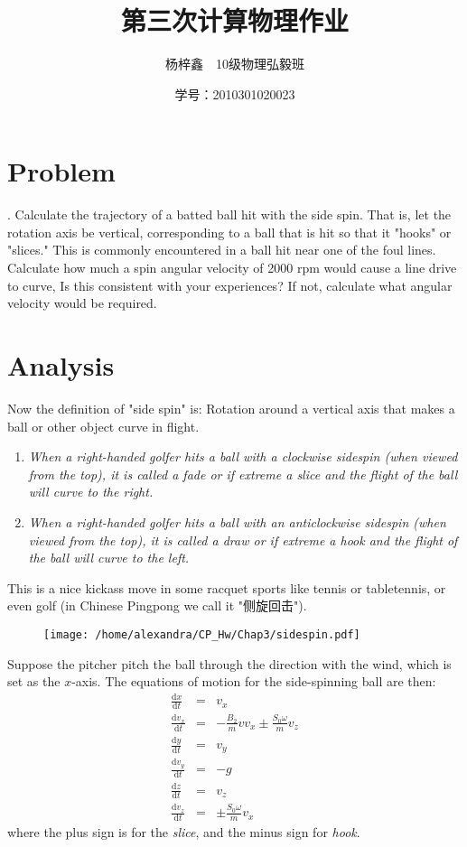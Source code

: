 \documentclass{article}
\author{杨梓鑫\ \ 10级物理弘毅班}
\title{第三次计算物理作业}
\date{学号：2010301020023}
\newcommand{\ud}{\mathrm{d}}
\begin{document}
	\maketitle
\section{Problem}
	\noindent {}. Calculate the trajectory of a batted ball hit with the side spin. That is, let the rotation axis be vertical, corresponding to a ball that is hit so that it "hooks" or "slices." This is commonly encountered in a ball hit near one of the foul lines. Calculate how much a spin angular velocity of 2000 rpm would cause a line drive to curve, Is this consistent with your experiences? If not, calculate what angular velocity would be required.

	\section{Analysis}
	Now the definition of "side spin" is: Rotation around a vertical axis that makes a ball or other object curve in flight.
\begin{enumerate} 
\item \textit {When a right-handed golfer hits a ball with a clockwise sidespin (when viewed from the top), it is called a \emph{fade} or if extreme a \emph{slice} and the flight of the ball will curve to the right.}
\item \textit {When a right-handed golfer hits a ball with an anticlockwise sidespin (when viewed from the top), it is called a \emph{draw} or if extreme a \emph{hook} and the flight of the ball will curve to the left.}
\end{enumerate} 
This is a nice kickass move in some racquet sports like tennis or tabletennis, or even golf (in Chinese Pingpong we call it "侧旋回击").\\
\begin{figure}[htbp]
\texttt{[image: /home/alexandra/CP\_Hw/Chap3/sidespin.pdf]}
\end{figure}

Suppose the pitcher pitch the ball through the direction with the wind, which is set as the $x$-axis. The equations of motion for the side-spinning ball are then:
\begin{eqnarray*}
	\frac{\ud x}{\ud t} &=& v_x\\
	\frac{\ud v_x}{\ud t} &=& -\frac{B_2}{m}vv_x \pm \frac{S_0\omega}{m}v_z\\
	\frac{\ud y}{\ud t} &=& v_y\\
	\frac{\ud v_y}{\ud t} &=& -g\\
	\frac{\ud z}{\ud t} &=& v_z\\
	\frac{\ud v_z}{\ud t} &=& \pm \frac{S_0\omega}{m}v_x
\end{eqnarray*}
where the plus sign is for the \emph{slice}, and the minus sign for \emph{hook}.\\
\end{document}
